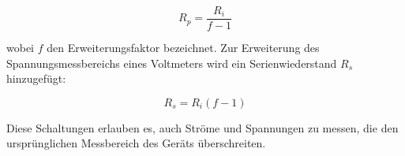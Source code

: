 \begin{equation}
    R_p = \frac{R_i}{f-1}
    \label{eq:stromerw}
\end{equation}

wobei $f$ den Erweiterungsfaktor bezeichnet. Zur Erweiterung des Spannungsmessbereichs eines Voltmeters wird ein Serienwiederstand $R_s$ hinzugefügt:

\begin{equation}
    R_s = R_i (f-1)
    \label{eq:spannungserw}
\end{equation}

Diese Schaltungen erlauben es, auch Ströme und Spannungen zu messen, die den ursprünglichen Messbereich des Geräts überschreiten.